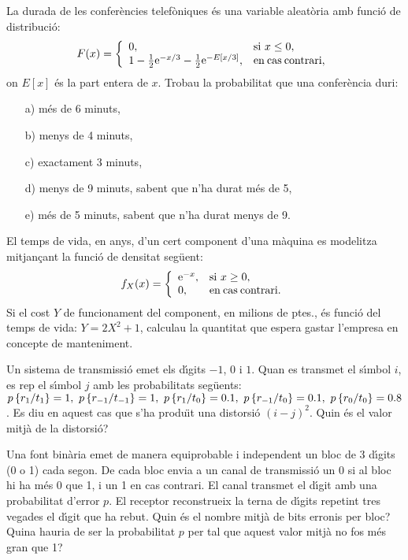 \newpage

\begin{prob} {La durada de les confer\`encies telef\`oniques \'es una variable
aleat\`oria amb funci\'o de distribuci\'o: $$ F(x) = \left\{ \begin{array}{ll} 0,
& {\rm si } \ x \leq 0,\\ 1-\frac{1}{2} {\rm e}^{-x/3}-\frac{1}{2} {\rm e}^{-E[x/3]}, & {\rm
en \> cas \> contrari}, \end{array} \right. $$ on $E[x]$ \'es la part entera de
$x$. Trobau la probabilitat que una confer\`encia duri:

\begin{itemize} \item[a)] m\'es de 6 minuts, \item[b)] menys de 4 minuts,
\item[c)] exactament 3 minuts, \item[d)] menys de 9 minuts, sabent que n'ha durat
m\'es de 5, \item[e)] m\'es de 5 minuts, sabent que n'ha durat menys de 9.
\end{itemize}} \end{prob}

\begin{prob}
{El temps de vida, en anys, d'un cert component d'una m\`aquina es 
modelitza mitjan\c{c}ant la funci\'o de densitat seg\"uent: 
$$
f_X(x) = \left\{ \begin{array}{ll} {\rm e}^{-x}, & {\rm si } \ x \geq 0,\\ 
0, & {\rm en \> cas \> contrari}.
\end{array} \right.
$$ 
Si el cost $Y$ de funcionament del component, en milions de ptes., 
\'es funci\'o del temps de vida: $Y = 2 X^2 + 1$, calculau
la quantitat que espera gastar l'empresa en concepte de manteniment.}
\end{prob}

\begin{prob}
{Un sistema de transmissi\'o emet els d\'{\i}gits $-1$, $0$ i $1$. 
Quan es transmet el s\'{\i}mbol $i$, es rep el s\'{\i}mbol $j$ 
amb les probabilitats seg\"uents: $p\left\{r_1 /t_1\right\} = 1,\  
p\left\{ r_{-1} / t_{-1}\right\} = 1,\  p\left\{ r_1 /t_0\right\} = 0.1, 
\ p\left\{ r_{-1} / t_0\right\} = 0.1, \ p\left\{ r_0 / t_0\right\} = 0.8$. Es diu en aquest cas que s'ha
produ\"{\i}t una distorsi\'o $(i-j)^2$. Quin \'es el valor mitj\`a de la
distorsi\'o?}
\end{prob}

\enlargethispage*{1000pt}

\begin{prob}
{Una font bin\`aria emet de manera equiprobable i independent un bloc de 3
d\'{\i}gits (0 o 1) cada segon. De cada bloc envia a un canal de transmissi\'o
un 0 si al bloc hi ha m\'es 0 que 1, i un 1 en cas contrari. El canal
transmet el d\'{\i}git amb una probabilitat d'error $p$. El receptor
reconstrueix la terna de d\'{\i}gits repetint tres vegades el d\'{\i}git que ha
rebut. Quin \'es el nombre mitj\`a de bits erronis per bloc? Quina hauria de
ser la probabilitat $p$ per tal que aquest valor mitj\`a no fos m\'es gran que
1?}
\end{prob}

